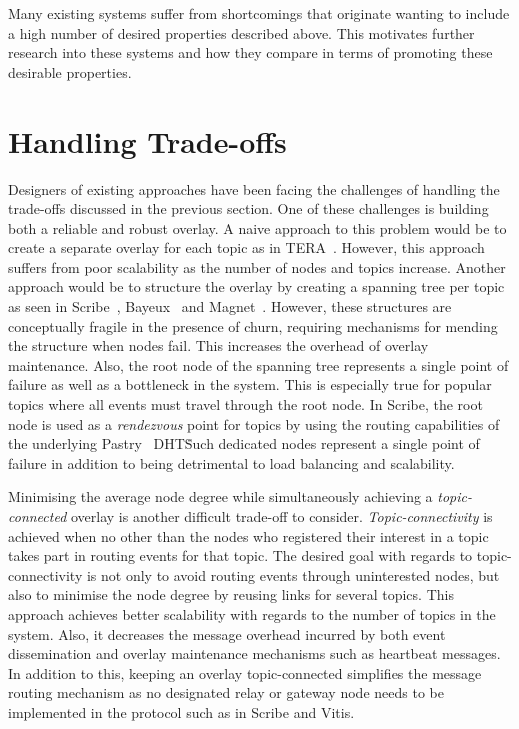 Many existing systems suffer from shortcomings that originate wanting
to include a high number of desired properties described above. This
motivates further research into these systems and how they compare in
terms of promoting these desirable properties.

\section{Handling Trade-offs}

Designers of existing approaches have been facing the challenges of
handling the trade-offs discussed in the previous section. One of these
challenges is building both a reliable and robust overlay. A naive
approach to this problem would be to create a separate overlay for each
topic as in TERA~\cite{Baldoni:2007}. However, this approach suffers from
poor scalability as the number of nodes and topics increase. Another
approach would be to structure the overlay by creating a spanning tree
per topic as seen in Scribe~\cite{Castro:2002}, Bayeux~\cite{Zhuang:2001}
and Magnet~\cite{Girdzijauskas:2010}. However, these structures are
conceptually fragile in the presence of churn, requiring mechanisms for
mending the structure when nodes fail. This increases the overhead of overlay
maintenance.  Also, the root node of the spanning tree represents a
single point of failure as well as a bottleneck in the system. This is
especially true for popular topics where all events must travel through
the root node. In Scribe, the root node is used as a \emph{rendezvous}
point for topics by using the routing capabilities of the underlying
Pastry~\cite{Rowstron:2001} DHT\. Such dedicated nodes represent a
single point of failure in addition to being detrimental to load
balancing and scalability.

Minimising the average node degree while simultaneously achieving a
\emph{topic-connected} overlay is another difficult trade-off to
consider. \emph{Topic-connectivity} is achieved when no other than the
nodes who registered their interest in a topic takes part in routing
events for that topic. The desired goal with regards to
topic-connectivity is not only to avoid routing events through
uninterested nodes, but also to minimise the node degree by reusing
links for several topics. This approach achieves better scalability with
regards to the number of topics in the system.  Also, it decreases the
message overhead incurred by both event dissemination and overlay
maintenance mechanisms such as heartbeat messages. In addition to this,
keeping an overlay topic-connected simplifies the message routing
mechanism as no designated relay or gateway node needs to be implemented
in the protocol such as in Scribe and Vitis.

